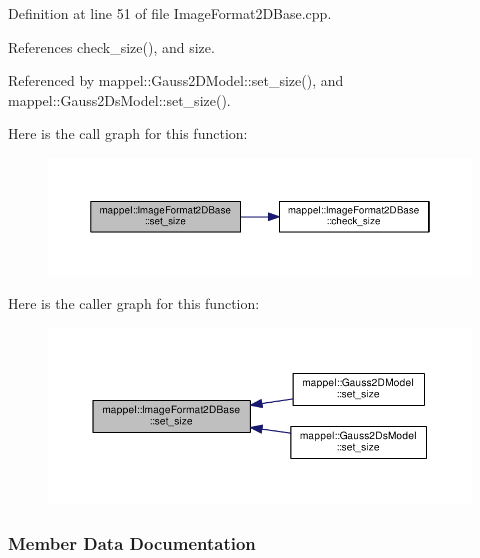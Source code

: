 Definition at line 51 of file Image\+Format2\+D\+Base.\+cpp.



References check\+\_\+size(), and size.



Referenced by mappel\+::\+Gauss2\+D\+Model\+::set\+\_\+size(), and mappel\+::\+Gauss2\+Ds\+Model\+::set\+\_\+size().



Here is the call graph for this function\+:\nopagebreak
\begin{figure}[H]
\begin{center}
\leavevmode
\includegraphics[width=350pt]{classmappel_1_1ImageFormat2DBase_afb0cba98e353625641646506aeb80372_cgraph}
\end{center}
\end{figure}




Here is the caller graph for this function\+:\nopagebreak
\begin{figure}[H]
\begin{center}
\leavevmode
\includegraphics[width=350pt]{classmappel_1_1ImageFormat2DBase_afb0cba98e353625641646506aeb80372_icgraph}
\end{center}
\end{figure}




\subsubsection{Member Data Documentation}
